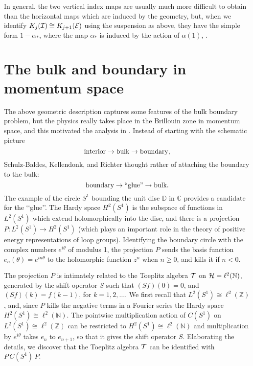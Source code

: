 \documentclass[11pt]{article}
\newcommand{\complex}{{\mathbb C}}
\newcommand{\integer}{{\mathbb Z}}
\newcommand{\ce}{{\cal E}}
\newcommand{\ci}{{\cal I}}
\newcommand{\hilb}{{\cal H}}
\newcommand{\cT}{{\cal T}}
\begin{document}
In general, the two vertical index maps are usually much more difficult to obtain than the horizontal maps which are induced by the geometry,  but, when we identify   $K_j(\ci) \cong K_{j+1}(\ce)$ using the suspension as above, they have the simple form $1-\alpha_*$,  where the map $\alpha_*$ is induced by the action of  $\alpha(1)$, \cite[Ex 9.K]{WO}.



%
%

\section{The bulk and boundary in momentum space}

The above geometric description captures some features of the bulk boundary problem, but the physics really takes  place in the Brillouin zone in momentum space, and this motivated the analysis in \cite{SKR, KRS}.
Instead of starting with the schematic picture 
$$
\hbox{{\rm interior}} \to \hbox{{\rm bulk}} \to \hbox{{\rm boundary}},
$$
Schulz-Baldes, Kellendonk, and Richter thought rather of attaching the boundary to the bulk:
$$
\hbox{{\rm boundary}} \to \hbox{{\rm \lq\lq glue\rq\rq}} \to \hbox{{\rm bulk}}.
$$
The example of the circle $S^1$ bounding the unit disc ${\mathbb D}$ in $\complex$ provides a candidate for the \lq\lq glue\rq\rq.
The Hardy space $H^2(S^1)$ is the subspace of functions in $L^2(S^1)$ which extend holomorphically into the disc, and there is a projection $P: L^2(S^1) \to H^2(S^1)$ (which plays an important role in the theory of positive energy representations of loop groups). Identifying the boundary circle with the complex numbers $e^{i\theta}$ of modulus 1, the projection $P$ sends the basis function $e_n(\theta) = e^{in\theta}$ to the holomorphic function $z^n$ when $n \geq 0$, and kills it if $n <0$.

The projection $P$ is intimately related to the Toeplitz algebra $\cT$  on $\hilb = \ell^2({\mathbb N})$, generated by the shift operator $S$ such that $(Sf)(0) = 0$, and $(Sf)(k) = f(k-1)$, for $k = 1,2,\ldots$.  
We first recall that $L^2(S^1) \cong \ell^2(\integer)$, and, since $P$ kills the negative terms in a Fourier series the Hardy space $H^2(S^1) \cong \ell^2({\mathbb N})$.
The  pointwise multiplication action of $C(S^1)$ on $L^2(S^1) \cong \ell^2(\integer)$ can be restricted to $H^2(S^1) \cong \ell^2({\mathbb N})$ and multiplication by $e^{i\theta}$ takes $e_n$ to $e_{n+1}$, so that it gives the shift operator $S$. Elaborating the details, we discover that the Toeplitz algebra $\cT$ can be identified with $P\, C(S^1)\, P$.
\end{document}
